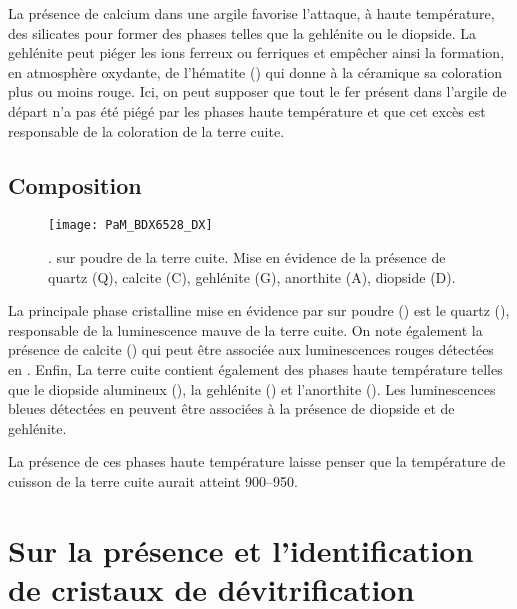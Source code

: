 La présence de calcium dans une argile favorise l'attaque, à haute 
température, des silicates pour former des phases telles que la 
gehlénite ou le diopside. La gehlénite peut piéger les ions ferreux 
ou ferriques et empêcher ainsi la formation, en atmosphère oxydante, 
de l'hématite () qui donne à la céramique sa coloration 
plus ou moins rouge. Ici, on peut supposer que tout le fer présent 
dans l'argile de départ n'a pas été piégé par les phases haute 
température et que cet excès est responsable de la coloration de 
la terre cuite.

\subsection{Composition \cristallo}
\begin{figure}[p]
  \texttt{[image: PaM\_BDX6528\_DX]}
  \caption[\ -- Diffraction de \RX sur poudre 
           de la terre cuite]
          {\legendeA.
           \DX[D] sur poudre de la terre cuite. 
           Mise en évidence de la présence de quartz (Q), 
           calcite (C), gehlénite (G), anorthite (A), diopside (D).}
  \label{DRX:6528}
\end{figure}

La principale phase cristalline mise en évidence par \DX sur 
poudre () est le quartz (\quartz), responsable de la 
luminescence mauve de la terre cuite. On note également la présence de 
calcite (\calcite) qui peut être associée aux luminescences rouges 
détectées en \CL. Enfin, La terre cuite contient également des phases 
haute température telles que le diopside alumineux (\diopsidealfe), la 
gehlénite (\gehlenite) et l'anorthite (\anorthite). Les luminescences 
bleues détectées en \CL peuvent être associées à la présence de 
diopside et de gehlénite.

La présence de ces phases haute température laisse penser 
que la température de cuisson de la terre cuite aurait atteint 
\SIrange[range-phrase=\ à\ ]{900}{950}{\degC}.


\section{Sur la présence et l'identification de cristaux de 
         dévitrification}

